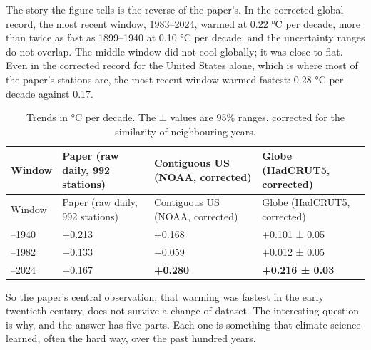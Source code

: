 The story the figure tells is the reverse of the paper's. In the corrected global record, the most recent window, 1983--2024, warmed at 0.22 °C per decade, more than twice as fast as 1899--1940 at 0.10 °C per decade, and the uncertainty ranges do not overlap. The middle window did not cool globally; it was close to flat. Even in the corrected record for the United States alone, which is where most of the paper's stations are, the most recent window warmed fastest: 0.28 °C per decade against 0.17.

\begin{longtable}[]{@{}
  >{\raggedright\arraybackslash}p{}
  >{\raggedright\arraybackslash}p{}
  >{\raggedright\arraybackslash}p{}
  >{\raggedright\arraybackslash}p{}@{}}
\caption{Trends in °C per decade. The ± values are 95\% ranges, corrected for the similarity of neighbouring years.}\label{tab:windows}\tabularnewline
\toprule\noalign{}
\begin{minipage}[b]{\linewidth}\raggedright
Window
\end{minipage} & \begin{minipage}[b]{\linewidth}\raggedright
Paper (raw daily, 992 stations)
\end{minipage} & \begin{minipage}[b]{\linewidth}\raggedright
Contiguous US (NOAA, corrected)
\end{minipage} & \begin{minipage}[b]{\linewidth}\raggedright
Globe (HadCRUT5, corrected)
\end{minipage} \\
\midrule\noalign{}
\endfirsthead
\toprule\noalign{}
\begin{minipage}[b]{\linewidth}\raggedright
Window
\end{minipage} & \begin{minipage}[b]{\linewidth}\raggedright
Paper (raw daily, 992 stations)
\end{minipage} & \begin{minipage}[b]{\linewidth}\raggedright
Contiguous US (NOAA, corrected)
\end{minipage} & \begin{minipage}[b]{\linewidth}\raggedright
Globe (HadCRUT5, corrected)
\end{minipage} \\
\midrule\noalign{}
\endhead
\bottomrule\noalign{}
\endlastfoot
1899--1940 & +0.213 & +0.168 & +0.101 ± 0.05 \\
1941--1982 & −0.133 & −0.059 & +0.012 ± 0.05 \\
1983--2024 & +0.167 & \textbf{+0.280} & \textbf{+0.216 ± 0.03} \\
\end{longtable}

So the paper's central observation, that warming was fastest in the early twentieth century, does not survive a change of dataset. The interesting question is why, and the answer has five parts. Each one is something that climate science learned, often the hard way, over the past hundred years.
